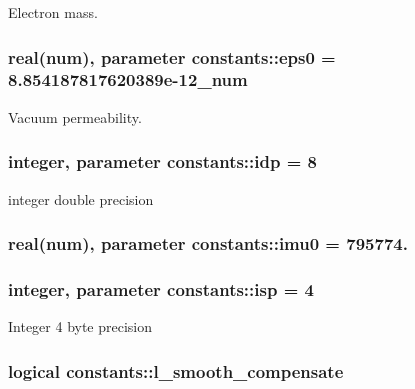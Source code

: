 Electron mass. 

\subsubsection[{\texorpdfstring{eps0}{eps0}}]{\setlength{\rightskip}{0pt plus 5cm}real({\bf num}), parameter constants\+::eps0 = 8.\+854187817620389e-\/12\+\_\+num}\hypertarget{namespaceconstants_a4fc609b4d7bd5d8e45e57bd0ba7c5e29}{}\label{namespaceconstants_a4fc609b4d7bd5d8e45e57bd0ba7c5e29}


Vacuum permeability. 

\subsubsection[{\texorpdfstring{idp}{idp}}]{\setlength{\rightskip}{0pt plus 5cm}integer, parameter constants\+::idp = 8}\hypertarget{namespaceconstants_ae345db51770e3628e6aaf76e6a45e160}{}\label{namespaceconstants_ae345db51770e3628e6aaf76e6a45e160}


integer double precision 

\subsubsection[{\texorpdfstring{imu0}{imu0}}]{\setlength{\rightskip}{0pt plus 5cm}real({\bf num}), parameter constants\+::imu0 = 795774.}\hypertarget{namespaceconstants_abcf10ccefe6023e0401ce1b4a5f74fb5}{}\label{namespaceconstants_abcf10ccefe6023e0401ce1b4a5f74fb5}
\subsubsection[{\texorpdfstring{isp}{isp}}]{\setlength{\rightskip}{0pt plus 5cm}integer, parameter constants\+::isp = 4}\hypertarget{namespaceconstants_a5a2ae450a00d2a29f9b70dcb776f7a2f}{}\label{namespaceconstants_a5a2ae450a00d2a29f9b70dcb776f7a2f}


Integer 4 byte precision 

\subsubsection[{\texorpdfstring{l\+\_\+smooth\+\_\+compensate}{l_smooth_compensate}}]{\setlength{\rightskip}{0pt plus 5cm}logical constants\+::l\+\_\+smooth\+\_\+compensate}\hypertarget{namespaceconstants_a91e41f33367410db88a66890aae444cc}{}\label{namespaceconstants_a91e41f33367410db88a66890aae444cc}
